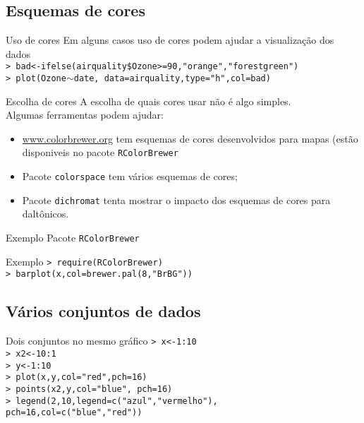 \documentclass{beamer}
\begin{document}
\subsection{Esquemas de cores}
\begin{frame}{Uso de cores}
Em alguns casos uso de cores podem ajudar a visualização dos dados \\
\texttt{> bad<-ifelse(airquality\$Ozone>=90,"orange","forestgreen")\\
> plot(Ozone$\sim$date, data=airquality,type="h",col=bad)}
\begin{center}
   
\end{center}
\end{frame}

\begin{frame}{Escolha de cores}
A escolha de quais cores usar não é algo simples. \\
Algumas ferramentas podem ajudar:
\begin{itemize}
\item \url{www.colorbrewer.org} tem esquemas de cores desenvolvidos para mapas (estão disponiveis no pacote \texttt{RColorBrewer}
\item Pacote \texttt{colorspace} tem vários esquemas de cores;
\item Pacote \texttt{dichromat} tenta mostrar o impacto dos esquemas de cores para daltônicos.
\end{itemize}
\end{frame}

\begin{frame}{Exemplo}
Pacote \texttt{RColorBrewer}\\
\centering
{}
\end{frame}
\begin{frame}{Exemplo}
\texttt{> require(RColorBrewer)\\
> barplot(x,col=brewer.pal(8,"BrBG"))}

\begin{center}
\end{center}
\end{frame}
\subsection{Vários conjuntos de dados}
\begin{frame}{Dois conjuntos no mesmo gráfico}
\texttt{> x<-1:10\\
> x2<-10:1\\
> y<-1:10\\
> plot(x,y,col="red",pch=16)\\
> points(x2,y,col="blue", pch=16)\\
> legend(2,10,legend=c("azul","vermelho"), \\
pch=16,col=c("blue","red"))}
\begin{center}
\end{center}
\end{frame}
\end{document}

